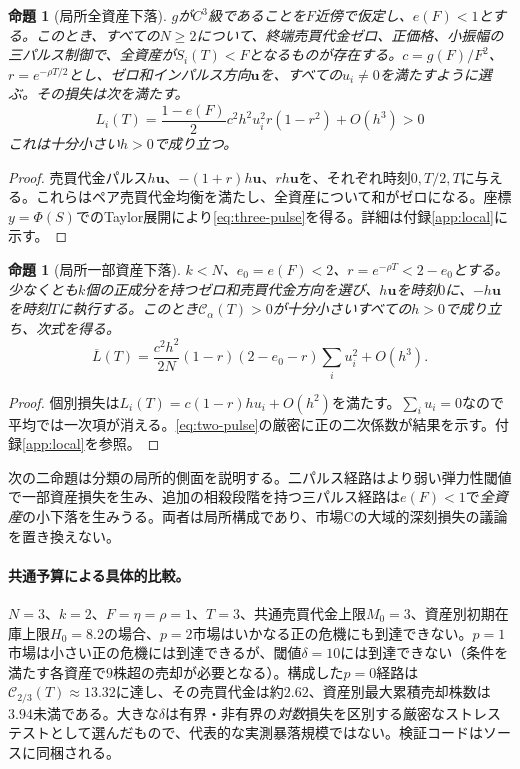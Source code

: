 \documentclass[11pt]{article}
\numberwithin{equation}{section}
\newtheorem{proposition}[theorem]{命題}
\theoremstyle{definition}
\theoremstyle{remark}
\newcommand{\Cris}{\mathcal{C}}
\begin{document}
\begin{proposition}[局所全資産下落]\label{prop:three-pulse}
$g$が$C^3$級であることを$F$近傍で仮定し、$e(F)<1$とする。このとき、すべての$N\ge2$について、終端売買代金ゼロ、正価格、小振幅の三パルス制御で、\emph{全資産が}$S_i(T)<F$となるものが存在する。$c=g(F)/F^2$、$r=e^{-\rho T/2}$とし、ゼロ和インパルス方向$\bm u$を、すべての$u_i\ne0$を満たすように選ぶ。その損失は次を満たす。
\begin{equation}\label{eq:three-pulse}
L_i(T)=\frac{1-e(F)}2c^2h^2u_i^2r(1-r^2)+O(h^3)>0
\end{equation}
これは十分小さい$h>0$で成り立つ。
\end{proposition}
\begin{proof}
売買代金パルス$h\bm u$、$-(1+r)h\bm u$、$rh\bm u$を、それぞれ時刻$0,T/2,T$に与える。これらはペア売買代金均衡を満たし、全資産について和がゼロになる。座標$y=\Phi(S)$でのTaylor展開により\eqref{eq:three-pulse}を得る。詳細は付録\ref{app:local}に示す。
\end{proof}

\begin{proposition}[局所一部資産下落]\label{prop:two-pulse}
$k<N$、$e_0=e(F)<2$、$r=e^{-\rho T}<2-e_0$とする。少なくとも$k$個の正成分を持つゼロ和売買代金方向を選び、$h\bm u$を時刻$0$に、$-h\bm u$を時刻$T$に執行する。このとき$\Cris_\alpha(T)>0$が十分小さいすべての$h>0$で成り立ち、次式を得る。
\begin{equation}\label{eq:two-pulse}
\overline L(T)=\frac{c^2h^2}{2N}(1-r)(2-e_0-r)\sum_iu_i^2+O(h^3).
\end{equation}
\end{proposition}
\begin{proof}
個別損失は$L_i(T)=c(1-r)hu_i+O(h^2)$を満たす。$\sum_i u_i=0$なので平均では一次項が消える。\eqref{eq:two-pulse}の厳密に正の二次係数が結果を示す。付録\ref{app:local}を参照。
\end{proof}

次の二命題は分類の局所的側面を説明する。二パルス経路はより弱い弾力性閾値で一部資産損失を生み、追加の相殺段階を持つ三パルス経路は$e(F)<1$で\emph{全資産}の小下落を生みうる。両者は局所構成であり、市場Cの大域的深刻損失の議論を置き換えない。

\paragraph{共通予算による具体的比較。} $N=3$、$k=2$、$F=\eta=\rho=1$、$T=3$、共通売買代金上限$M_0=3$、資産別初期在庫上限$H_0=8.2$の場合、$p=2$市場はいかなる正の危機にも到達できない。$p=1$市場は小さい正の危機には到達できるが、閾値$\delta=10$には到達できない（条件を満たす各資産で$9$株超の売却が必要となる）。構成した$p=0$経路は$\Cris_{2/3}(T)\approx13.32$に達し、その売買代金は約$2.62$、資産別最大累積売却株数は$3.94$未満である。大きな$\delta$は有界・非有界の\emph{対数}損失を区別する厳密なストレステストとして選んだもので、代表的な実測暴落規模ではない。検証コードはソースに同梱される。
\end{document}
